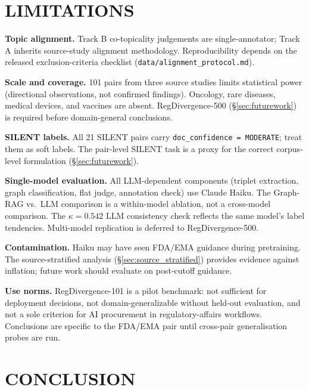 \documentclass[manuscript]{acmart}
\makeatletter
\let\@acmt@@section\section
\renewcommand{\section}[1]{%
  \@acmt@@section{\texorpdfstring{\MakeUppercase{#1}}{#1}}}
\makeatother
\begin{document}
\section{Limitations}
\label{sec:limitations}

\textbf{Topic alignment.} Track B co-topicality judgements are single-annotator;
Track A inherits source-study alignment methodology. Reproducibility depends on
the released exclusion-criteria checklist (\texttt{data/alignment\_protocol.md}).

\textbf{Scale and coverage.} 101 pairs from three source studies limits
statistical power (directional observations, not confirmed findings). Oncology,
rare diseases, medical devices, and vaccines are absent. RegDivergence-500
(\S\ref{sec:futurework}) is required before domain-general conclusions.

\textbf{SILENT labels.} All 21 SILENT pairs carry \texttt{doc\_confidence = MODERATE};
treat them as soft labels. The pair-level SILENT task is a proxy for the correct
corpus-level formulation (\S\ref{sec:futurework}).

\textbf{Single-model evaluation.} All LLM-dependent components (triplet extraction,
graph classification, flat judge, annotation check) use Claude Haiku. The
Graph-RAG vs.\ LLM comparison is a within-model ablation, not a cross-model
comparison. The $\kappa = 0.542$ LLM consistency check reflects the same model's
label tendencies. Multi-model replication is deferred to RegDivergence-500.

\textbf{Contamination.} Haiku may have seen FDA/EMA guidance during pretraining.
The source-stratified analysis (\S\ref{sec:source_stratified}) provides evidence
against inflation; future work should evaluate on post-cutoff guidance.

\textbf{Use norms.} RegDivergence-101 is a pilot benchmark: not sufficient for
deployment decisions, not domain-generalizable without held-out evaluation, and
not a sole criterion for AI procurement in regulatory-affairs workflows.
Conclusions are specific to the FDA/EMA pair until cross-pair generalisation
probes are run.

\section{Conclusion}
\end{document}
